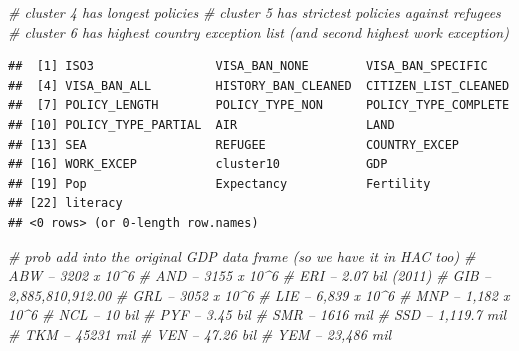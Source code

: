 \documentclass[]{article}
\newenvironment{Shaded}{\begin{snugshade}}{\end{snugshade}}
\newcommand{\CommentTok}[1]{\textcolor[rgb]{0.56,0.35,0.01}{\textit{#1}}}
\newcommand{\KeywordTok}[1]{\textcolor[rgb]{0.13,0.29,0.53}{\textbf{#1}}}
\newcommand{\NormalTok}[1]{#1}
\newcommand{\OperatorTok}[1]{\textcolor[rgb]{0.81,0.36,0.00}{\textbf{#1}}}
\begin{document}
\begin{Shaded}
\begin{Highlighting}[]
\CommentTok{# cluster 4 has longest policies}
\CommentTok{# cluster 5 has strictest policies against refugees}
\CommentTok{# cluster 6 has highest country exception list (and second highest work exception)}
\end{Highlighting}
\end{Shaded}

\begin{Shaded}
\end{Shaded}

\begin{verbatim}
##  [1] ISO3                 VISA_BAN_NONE        VISA_BAN_SPECIFIC   
##  [4] VISA_BAN_ALL         HISTORY_BAN_CLEANED  CITIZEN_LIST_CLEANED
##  [7] POLICY_LENGTH        POLICY_TYPE_NON      POLICY_TYPE_COMPLETE
## [10] POLICY_TYPE_PARTIAL  AIR                  LAND                
## [13] SEA                  REFUGEE              COUNTRY_EXCEP       
## [16] WORK_EXCEP           cluster10            GDP                 
## [19] Pop                  Expectancy           Fertility           
## [22] literacy            
## <0 rows> (or 0-length row.names)
\end{verbatim}

\begin{Shaded}
\begin{Highlighting}[]
\CommentTok{# prob add into the original GDP data frame (so we have it in HAC too)}
\CommentTok{# ABW -- 3202 x 10^6}
\CommentTok{# AND -- 3155 x 10^6}
\CommentTok{# ERI -- 2.07 bil (2011)}
\CommentTok{# GIB -- 2,885,810,912.00}
\CommentTok{# GRL -- 3052 x 10^6}
\CommentTok{# LIE -- 6,839 x 10^6}
\CommentTok{# MNP -- 1,182 x 10^6}
\CommentTok{# NCL -- 10 bil}
\CommentTok{# PYF -- 3.45 bil}
\CommentTok{# SMR -- 1616 mil}
\CommentTok{# SSD -- 1,119.7 mil}
\CommentTok{# TKM -- 45231 mil}
\CommentTok{# VEN -- 47.26 bil}
\CommentTok{# YEM -- 23,486 mil}
\end{Highlighting}
\end{Shaded}

\begin{Shaded}
\end{Shaded}
\end{document}
